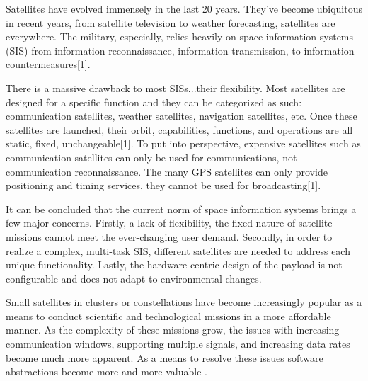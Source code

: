 \documentclass[../main.tex]{subfiles}
\begin{document}
Satellites have evolved immensely in the last 20 years. They've become ubiquitous in recent years, from satellite television to weather forecasting, satellites are everywhere. The military, especially, relies heavily on space information systems (SIS) from information reconnaissance, information transmission, to information countermeasures[1]. 

There is a massive drawback to most SISs...their flexibility. Most satellites are designed for a specific function and they can be categorized as such: communication satellites, weather satellites, navigation satellites, etc. Once these satellites are launched, their orbit, capabilities, functions, and operations are all static, fixed, unchangeable[1]. To put into perspective, expensive satellites such as communication satellites can only be used for communications, not communication reconnaissance. The many GPS satellites can only provide positioning and timing services, they cannot be used for broadcasting[1]. 

It can be concluded that the current norm of space information systems brings a few major concerns. Firstly, a lack of flexibility, the fixed nature of satellite missions cannot meet the ever-changing user demand. Secondly, in order to realize a complex, multi-task SIS, different satellites are needed to address each unique functionality. Lastly, the hardware-centric design of the payload is not configurable and does not adapt to environmental changes.

Small satellites in clusters or constellations have become increasingly popular as a means to conduct scientific and technological missions in a more affordable manner. As the complexity of these missions grow, the issues with increasing communication windows, supporting multiple signals, and increasing data rates become much more apparent. As a means to resolve these issues software abstractions become more and more valuable \cite{sdr_satellite}.
\end{document}
